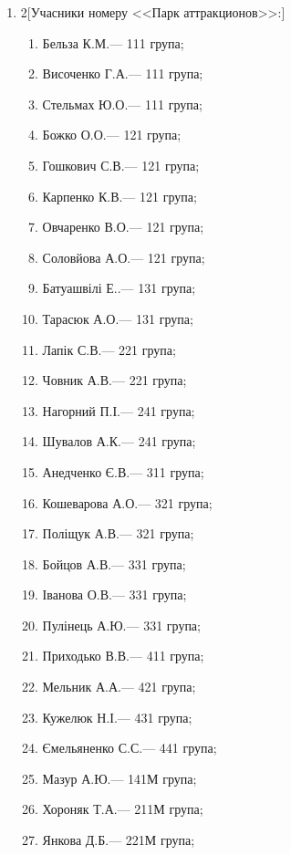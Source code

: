 \documentclass[
	a4paper,
	12pt,
	oneside,
	draft
]{extreport}
\begin{document}
\begin{enumerate}[topsep=0pt,itemsep=-1ex,partopsep=0ex,parsep=1ex]
\item 
\begin{multicols}{2}[Учасники номеру <<Парк аттракционов>>:] 
\begin{enumerate}[topsep=0pt,itemsep=-1ex,partopsep=0ex,parsep=1ex,label=\arabic*.]
\item Бельза К.М.\hfill --- 111 група;
\item Височенко Г.А.\hfill --- 111 група;
\item Стельмах Ю.О.\hfill --- 111 група;
\item Божко О.О.\hfill --- 121 група;
\item Гошкович С.В.\hfill --- 121 група;
\item Карпенко К.В.\hfill --- 121 група;
\item Овчаренко В.О.\hfill --- 121 група;
\item Соловйова А.О.\hfill --- 121 група;
\item Батуашвілі Е..\hfill --- 131 група;
\item Тарасюк А.О.\hfill --- 131 група;
\item Лапік С.В.\hfill --- 221 група;
\item Човник А.В.\hfill --- 221 група;
\item Нагорний П.І.\hfill --- 241 група;
\item Шувалов А.К.\hfill --- 241 група;
\item Анедченко Є.В.\hfill --- 311 група;
\item Кошеварова А.О.\hfill --- 321 група;
\item Поліщук А.В.\hfill --- 321 група;
\item Бойцов А.В.\hfill --- 331 група;
\item Іванова О.В.\hfill --- 331 група;
\item Пулінець А.Ю.\hfill --- 331 група;
\item Приходько В.В.\hfill --- 411 група;
\item Мельник А.А.\hfill --- 421 група;
\item Кужелюк Н.І.\hfill --- 431 група;
\item Ємельяненко С.С.\hfill --- 441 група;
\item Мазур А.Ю.\hfill --- 141М група;
\item Хороняк Т.А.\hfill --- 211М група;
\item Янкова Д.Б.\hfill --- 221М група;
\end{enumerate}
\end{multicols}


\end{enumerate}
\end{document}
